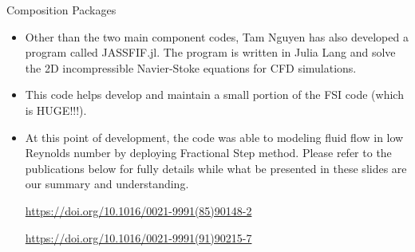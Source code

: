 \documentclass[\string~/GitHub/sthlmNordBeamerTheme/sthlmNordLightDemo.tex]{subfiles}
\begin{document}
\begin{frame}[c]{Composition Packages}

    \begin{itemize}
		
        \item Other than the two main component codes, Tam Nguyen has also developed a program called JASSFIF.jl. The program is written in Julia Lang and solve the 2D incompressible Navier-Stoke equations for CFD simulations.

        \item This code helps develop and maintain a small portion of the FSI code (which is HUGE!!!).

        \item At this point of development, the code was able to modeling fluid flow in low Reynolds number by deploying Fractional Step method. Please refer to the publications below for fully details while what be presented in these slides are our summary and understanding.
            \begin{center}
                \url{https://doi.org/10.1016/0021-9991(85)90148-2}
            \end{center}

            \begin{center}
                \url{https://doi.org/10.1016/0021-9991(91)90215-7}
            \end{center}
            
    \end{itemize}
 
\end{frame}
\end{document}
